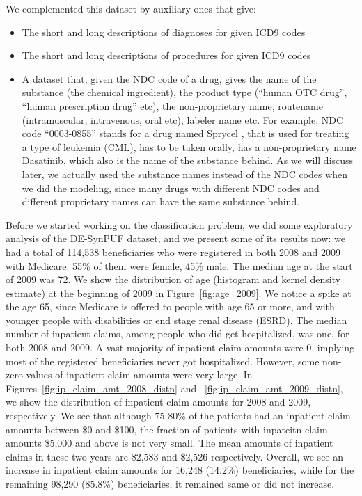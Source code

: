 We complemented this dataset by auxiliary ones that give: 
\begin{itemize}
\item The short and long descriptions of diagnoses for given ICD9 codes
\item The short and long descriptions of procedures for given ICD9 codes
\item A dataset that, given the NDC code of a drug, gives the name of the substance (the chemical ingredient), the product type (``human OTC drug'', ``human prescription drug'' etc), the non-proprietary name, routename (intramuscular, intravenous, oral etc), labeler name etc. For example, NDC code ``0003-0855'' stands for a drug named Sprycel \cite{sprycel}, that is used for treating a type of leukemia (CML), has to be taken orally, has a non-proprietary name Dasatinib, which also is the name of the substance behind. As we will discuss later, we actually used the substance names instead of the NDC codes when we did the modeling, since many drugs with different NDC codes and different proprietary names can have the same substance behind.  
\end{itemize}
 
Before we started working on the classification problem, we did some exploratory analysis of the DE-SynPUF dataset, and we present some of its results now: we had a total of 114,538 beneficiaries who were registered in both 2008 and 2009 with Medicare. 55\% of them were female, 45\% male. The median age at the start of 2009 was 72. We show the distribution of age (histogram and kernel density estimate) at the beginning of 2009 in Figure~\ref{fig:age_2009}. We notice a spike at the age 65, since Medicare is offered to people with age 65 or more, and with younger people with disabilities or end stage renal disease (ESRD). The median number of inpatient claims, among people who did get hospitalized, was one, for both 2008 and 2009. A vast majority of inpatient claim amounts were 0, implying most of the registered beneficiaries never got hospitalized. However, some non-zero values of inpatient claim amounts were very large. In Figures~\ref{fig:ip_claim_amt_2008_distn} and ~\ref{fig:ip_claim_amt_2009_distn}, we show the distribution of inpatient claim amounts for 2008 and 2009, respectively. We see that although 75-80\% of the patients had an inpatient claim amounts between \$0 and \$100, the fraction of patients with inpateitn claim amounts \$5,000 and above is not very small. The mean amounts of inpatient claims in these two years are \$2,583 and \$2,526 respectively. Overall, we see an increase in inpatient claim amounts for 16,248 (14.2\%) beneficiaries, while for the remaining 98,290 (85.8\%) beneficiaries, it remained same or did not increase.


